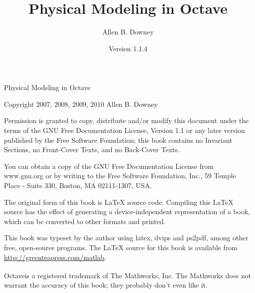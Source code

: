 \documentclass{book}
\newcommand{\myreg}{\textsuperscript{{\tiny \textregistered}}}
\begin{document}

\newcommand{\thetitle}{Physical Modeling in Octave\myreg}
\newcommand{\theversion}{1.1.4}

\title {\thetitle}
\author {Allen B. Downey}
\date {Version \theversion}



\begin{latexonly}



\maketitle

\vspace{2in}

\begin{center}
{\Large \thetitle}

\vspace{0.25in}

Copyright 2007, 2008, 2009, 2010 Allen B. Downey
\end{center}

\vspace{0.25in}

Permission is granted to copy, distribute and/or modify this
document under the terms of the GNU Free Documentation License,
Version 1.1 or any later version published by the Free Software
Foundation; this book contains no Invariant Sections,
no Front-Cover Texts, and no Back-Cover Texts.

You can obtain a copy of the GNU Free Documentation License
from www.gnu.org or by writing to the Free Software Foundation,
Inc., 59 Temple Place - Suite 330, Boston, MA 02111-1307, USA.

The original form of this book is LaTeX source code.
Compiling this LaTeX source has the effect of generating
a device-independent representation of a book, which
can be converted to other formats and printed.

This book was typeset by the author using latex, dvips and ps2pdf,
among other free, open-source programs.
The LaTeX source for this book is available from
\url{http://greenteapress.com/matlab}.

Octave\myreg is a registered trademark of The
Mathworks, Inc. The Mathworks does not warrant the accuracy
of this book; they probably don't even like it.

\frontmatter

\end{latexonly}
\end{document}
